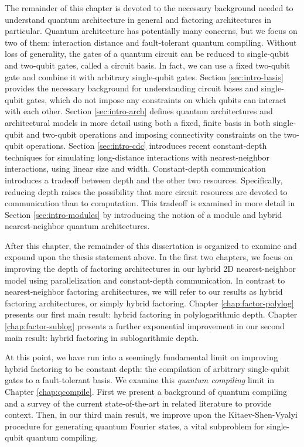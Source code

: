 The remainder of this chapter is devoted to the necessary background needed
to understand quantum architecture in general and factoring architectures
in particular. Quantum architecture has potentially many concerns, but we
focus on two of them: interaction distance and fault-tolerant quantum compiling.
Without loss of generality, the gates of a quantum circuit can be reduced to
single-qubit and two-qubit gates, called a circuit basis.
In fact, we can use a fixed two-qubit gate
and combine it with arbitrary single-qubit gates.
Section \ref{sec:intro-basis} provides the necessary background for
understanding circuit bases and single-qubit gates,
which do not impose any constraints on
which qubits can interact with each other. Section \ref{sec:intro-arch}
defines quantum architectures and architectural models in more detail using
both a fixed, finite basis in both single-qubit and two-qubit operations
and imposing connectivity constraints on the two-qubit operations.
Section \ref{sec:intro-cdc} introduces recent constant-depth techniques
for simulating long-distance interactions with nearest-neighbor
interactions, using linear size and width. Constant-depth communication
introduces a tradeoff between depth and the other two resources. Specifically,
reducing depth raises the possibility that more circuit resources are
devoted to communication than to computation. This tradeoff is examined 
in more detail in Section \ref{sec:intro-modules}
by introducing the notion of a module and hybrid nearest-neighbor
quantum architectures.

After this chapter, the remainder of this dissertation is organized to
examine and expound upon the thesis statement above. In the first two
chapters, we focus on improving the depth of factoring architectures
in our hybrid 2D nearest-neighbor model using parallelization and
constant-depth communication. In contrast to nearest-neighbor factoring
architectures, we will refer to our results as hybrid factoring architectures,
or simply hybrid factoring.
Chapter \ref{chap:factor-polylog} presents our first main result:
hybrid factoring in polylogarithmic depth.
Chapter \ref{chap:factor-sublog} presents a further exponential improvement
in our second main result: hybrid factoring in sublogarithmic depth.

At this point, we have run into a seemingly fundamental limit on improving
hybrid factoring to be constant depth: the compilation of arbitrary
single-qubit gates to a fault-tolerant basis. We examine this
\emph{quantum compiling} limit in Chapter \ref{chap:qcompile}. First we
present a background of quantum compiling and a survey of the current
state-of-the-art in related literature to provide context. Then, in our
third main result, we improve
upon the Kitaev-Shen-Vyalyi procedure for generating quantum Fourier states,
a vital subproblem for single-qubit quantum compiling.

